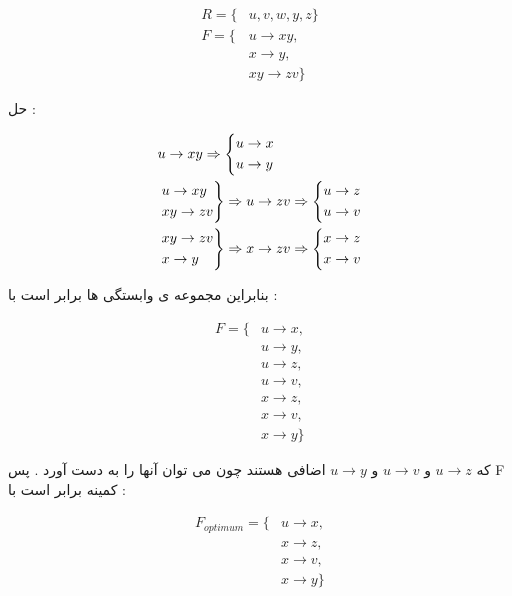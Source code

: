 \documentclass{article}
\begin{document}
\begin{align*}
R = \{ &u , v , w , y , z \} \\
F = \{ &u \to xy , \\
&x \to y , \\
&xy \to zv  \} 
\end{align*}



حل : 

\begin{align*}
&u \to xy \Rightarrow \begin{cases*}  u \to x \\ u \to y \end{cases*}  \\
&\begin{rcases*} u \to xy \\  xy \to zv \end{rcases*} \Rightarrow u \to zv \Rightarrow \begin{cases*} 
u \to z \\ u \to v \end{cases*} \\
&\begin{rcases*} xy \to zv \\ x \to y \end{rcases*} \Rightarrow x \to zv \Rightarrow \begin{cases*} x \to z \\ x \to v \end{cases*} \\
\end{align*}

بنابراین مجموعه ی وابستگی ها برابر است با :

\begin{align*}
F = \{ &u \to x , \\ 
&u \to y , \\
&u \to z , \\
&u \to v , \\
&x \to z , \\
&x \to v , \\
&x \to y \} 
\end{align*}


که 
$u \to z$
و
$u \to v$
و
$u \to y$
اضافی هستند چون می توان آنها را به دست آورد . پس F کمینه برابر است با :

\begin{align*}
F_{optimum} = \{ &u \to x , \\
&x \to z , \\
&x \to v , \\
&x \to y \} 
\end{align*}
\end{document}
